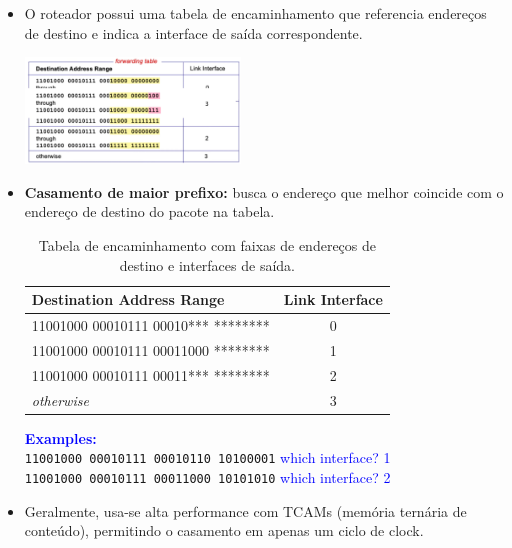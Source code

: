             \begin{itemize}[left=0.5cm, align=left, nosep]
                \item O roteador possui uma tabela de encaminhamento que referencia endereços de destino e indica a interface de saída correspondente.
            
                \begin{center}
                    \includegraphics[width=0.45\textwidth]{img/cap-04/tabela-de-encaminhamento.png}
                \end{center}

                \item \textbf{Casamento de maior prefixo:} busca o endereço que melhor coincide com o endereço de destino do pacote na tabela.
            
                \begin{table}[h!]
                    \centering
                    \renewcommand{\arraystretch}{1.2}
                    \setlength{\tabcolsep}{6pt}

                    \begin{tabular}{|l|c|}
                        \hline
                        \textbf{Destination Address Range} & \textbf{Link Interface} \\ \hline
                        11001000 00010111 00010*** ******** & 0 \\ \hline
                        11001000 00010111 00011000 ******** & 1 \\ \hline
                        11001000 00010111 00011*** ******** & 2 \\ \hline
                        \textit{otherwise} & 3 \\ \hline
                    \end{tabular}

                    \caption{Tabela de encaminhamento com faixas de endereços de destino e interfaces de saída.}
                \end{table} 

                \textbf{\textcolor{blue}{Examples:}} \\[2pt]
                \texttt{11001000 00010111 00010110 10100001} \quad \textcolor{blue}{which interface? 1 } \\
                \texttt{11001000 00010111 00011000 10101010} \quad \textcolor{blue}{which interface? 2 }

                \item Geralmente, usa-se alta performance com TCAMs (memória ternária de conteúdo), permitindo o casamento em apenas um ciclo de clock.

            \end{itemize}

